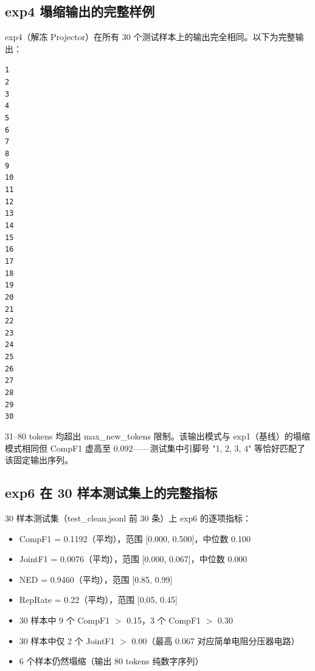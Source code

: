 \subsection{exp4 塌缩输出的完整样例}

exp4（解冻 Projector）在所有 30 个测试样本上的输出完全相同。以下为完整输出：

\texttt{1\\2\\3\\4\\5\\6\\7\\8\\9\\10\\11\\12\\13\\14\\15\\16\\17\\18\\19\\20\\21\\22\\23\\24\\25\\26\\27\\28\\29\\30}

31--80 tokens 均超出 max\_new\_tokens 限制。该输出模式与 exp1（基线）的塌缩模式相同但 CompF1 虚高至 0.092——测试集中引脚号 "1, 2, 3, 4" 等恰好匹配了该固定输出序列。

\subsection{exp6 在 30 样本测试集上的完整指标}

30 样本测试集（test\_clean.jsonl 前 30 条）上 exp6 的逐项指标：

\begin{itemize}[nosep]
    \item CompF1 = 0.1192（平均），范围 [0.000, 0.500]，中位数 0.100
    \item JointF1 = 0.0076（平均），范围 [0.000, 0.067]，中位数 0.000
    \item NED = 0.9460（平均），范围 [0.85, 0.99]
    \item RepRate = 0.22（平均），范围 [0.05, 0.45]
    \item 30 样本中 9 个 CompF1 $>$ 0.15，3 个 CompF1 $>$ 0.30
    \item 30 样本中仅 2 个 JointF1 $>$ 0.00（最高 0.067 对应简单电阻分压器电路）
    \item 6 个样本仍然塌缩（输出 80 tokens 纯数字序列）
\end{itemize}

